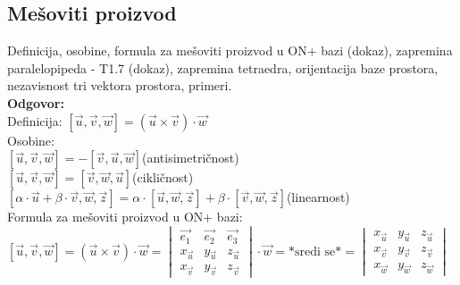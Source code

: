 \documentclass[12pt]{article}
\begin{document}
    \subsection{Mešoviti proizvod}
    Definicija, osobine, formula za mešoviti proizvod u ON+
    bazi (dokaz), zapremina paralelopipeda - T1.7 (dokaz),
    zapremina tetraedra, orijentacija baze prostora, nezavisnost
    tri vektora prostora, primeri.\\
    \textbf{Odgovor:}\\
    Definicija: $[\overrightarrow{u},\overrightarrow{v},\overrightarrow{w}]=(\overrightarrow{u}\times\overrightarrow{v})\cdot\overrightarrow{w}$\\
    Osobine:\\
$[\overrightarrow{u},\overrightarrow{v},\overrightarrow{w}]=-[\overrightarrow{v},\overrightarrow{u},\overrightarrow{w}]$\hspace*{1cm}(antisimetričnost)\\
$[\overrightarrow{u},\overrightarrow{v},\overrightarrow{w}]=[\overrightarrow{v},\overrightarrow{w},\overrightarrow{u}]$\hspace*{1cm}(cikličnost)\\
$[\alpha\cdot\overrightarrow{u}+\beta\cdot\overrightarrow{v},\overrightarrow{w},\overrightarrow{z}]=\alpha\cdot[\overrightarrow{u},\overrightarrow{w},\overrightarrow{z}]+\beta\cdot[\overrightarrow{v},\overrightarrow{w},\overrightarrow{z}]$\hspace*{1cm}(linearnost)\\
    Formula za mešoviti proizvod u ON+ bazi:\\
$[\overrightarrow{u},\overrightarrow{v},\overrightarrow{w}]=(\overrightarrow{u}\times\overrightarrow{v})\cdot\overrightarrow{w}= \begin{vmatrix}
    \overrightarrow{e_1}   & \overrightarrow{e_2}   & \overrightarrow{e_3}   \\
    x_{\overrightarrow{u}} & y_{\overrightarrow{u}} & z_{\overrightarrow{u}} \\
    x_{\overrightarrow{v}} & y_{\overrightarrow{v}} & z_{\overrightarrow{v}}
\end{vmatrix}\cdot\overrightarrow{w}=\text{*sredi se*}= \begin{vmatrix}
    x_{\overrightarrow{u}} & y_{\overrightarrow{u}} & z_{\overrightarrow{u}} \\
    x_{\overrightarrow{v}} & y_{\overrightarrow{v}} & z_{\overrightarrow{v}} \\
    x_{\overrightarrow{w}} & y_{\overrightarrow{w}} & z_{\overrightarrow{w}}
\end{vmatrix}$\\[0.3cm]
\end{document}
